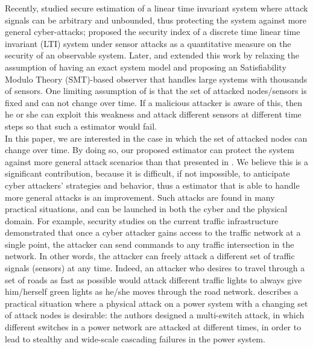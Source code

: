 \documentclass[../../thesis.tex]{subfiles}
\begin{document}
Recently, \cite{Fawzi2014} studied secure estimation of a linear time invariant system where attack signals can be arbitrary and unbounded, thus protecting the system against more general cyber-attacks; \cite{chong2016characterising} proposed the security index of a discrete time linear time invariant (LTI) system under sensor attacks as a quantitative measure on the security of an observable system.
Later, \cite{Pajic2014} and \cite{shoukry2016smt} extended this work by relaxing the assumption of having an exact system model and proposing an Satisfiability Modulo Theory (SMT)-based observer that handles large systems with thousands of sensors. One limiting assumption of \cite{Fawzi2014} \cite{Pajic2014} \cite{shoukry2016smt} is that the set of attacked nodes/sensors is fixed and can not change over time. If a malicious attacker is aware of this, then he or she can exploit this weakness and attack different sensors at different time steps so that such a estimator would fail.\\
In this paper, we are interested in the case in which the set of attacked nodes can change over time. By doing so, our proposed estimator can protect the system against more general attack scenarios than that presented in \cite{Fawzi2014}. We believe this is a significant contribution, because it is difficult, if not impossible, to anticipate cyber attackers' strategies and behavior, thus a estimator that is able to handle more general attacks is an improvement. 
Such attacks are found in many practical situations, and can be launched in both the cyber and the physical domain.
For example, security studies on the current traffic infrastructure \cite{ghena2014traffic} demonstrated that once a cyber attacker gains access to the traffic network at a single point, the attacker can send commands to any traffic intersection in the network. In other words, the attacker can freely attack a different set of traffic signals (sensors) at any time. Indeed, an attacker who desires to travel through a set of roads as fast as possible would attack different traffic lights to always give him/herself green lights as he/she moves through the road network. 
\cite{liu2014coordinated} describes a practical situation where a physical attack on a power system with a changing set of attack nodes is desirable: the authors designed a multi-switch attack, in which different switches in a power network are attacked at different times, in order to lead to stealthy and wide-scale cascading failures in the power system.
\end{document}
